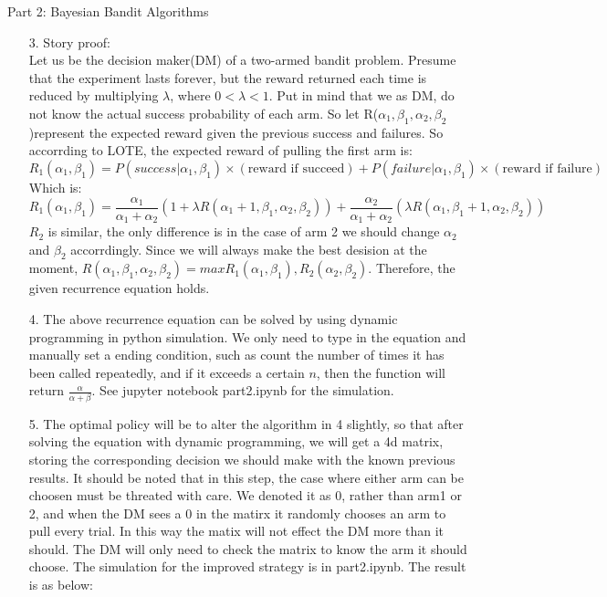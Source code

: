 \documentclass{article}
\begin{document}
\begin{homeworkProblem}{Part 2: Bayesian Bandit Algorithms}
\begin{enumerate}
        \item[3.]
        Story proof:\\
        Let us be the decision maker(DM) of a two-armed bandit problem. Presume that the experiment lasts forever, 
        but the reward returned each time is reduced by multiplying $\lambda$, where $0<\lambda<1$. Put in mind that we as DM, 
        do not know the actual success probability of each arm. So let R($\alpha_1,\beta_1,\alpha_2,\beta_2$)represent the expected reward given the previous success and failures.
        So accorrding to LOTE, the expected reward of pulling the first arm is:
        $$R_1(\alpha_1,\beta_1) = P(success|\alpha_1,\beta_1)\times(\text{reward if succeed})+P(failure|\alpha_1,\beta_1)\times(\text{reward if failure})$$
        Which is:
        $$R_1(\alpha_1,\beta_1) = \frac{\alpha_1}{\alpha_1+\alpha_2}(1+\lambda R(\alpha_1+1,\beta_1,\alpha_2,\beta_2))+\frac{\alpha_2}{\alpha_1+\alpha_2}(\lambda R(\alpha_1,\beta_1+1,\alpha_2,\beta_2))$$
        $R_2$ is similar, the only difference is in the case of arm 2 we should change $\alpha_2$ and $\beta_2$ accorrdingly.
        Since we will always make the best desision at the moment, $R(\alpha_1,\beta_1,\alpha_2,\beta_2) = max{R_1(\alpha_1,\beta_1),R_2(\alpha_2,\beta_2)}$.
        Therefore, the given recurrence equation holds.
        \item[4.]
        The above recurrence equation can be solved by using dynamic programming in python simulation. We only need to type in the equation and manually set a ending condition,
        such as count the number of times it has been called repeatedly, and if it exceeds a certain $n$, then the function will return $\frac{\alpha}{\alpha+\beta}$.
        See jupyter notebook part2.ipynb for the simulation.
        \item[5.]
        The optimal policy will be to alter the algorithm in 4 slightly, so that after solving the equation with dynamic programming, we will get a 4d matrix, storing the corresponding decision we should make 
        with the known previous results. It should be noted that in this step, the case where either arm can be choosen must be threated with care. We denoted it as 0, rather than arm1 or 2, 
        and when the DM sees a 0 in the matirx it randomly chooses an arm to pull every trial. In this way the matix will not effect the DM more than it should.
        The DM will only need to check the matrix to know the arm it should choose. The simulation for the improved strategy is in part2.ipynb.
        The result is as below:

\end{enumerate}
\end{homeworkProblem}
\end{document}
